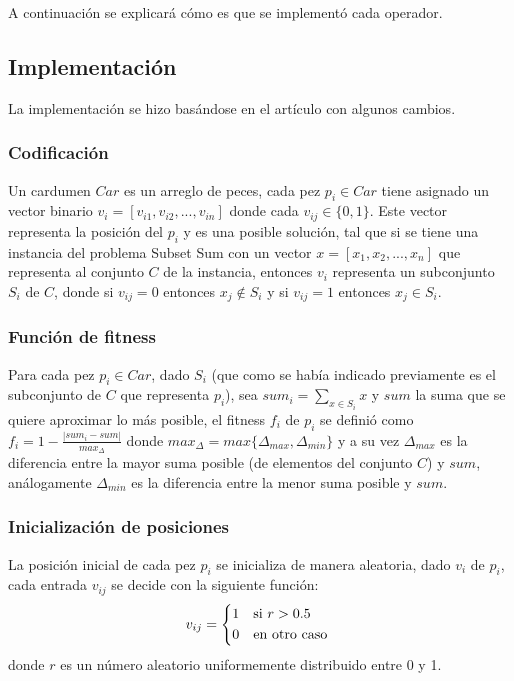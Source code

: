 \documentclass[12pt]{article}
\begin{document}
A continuación se explicará cómo es que se implementó cada operador.

\newpage

\subsection{Implementación}
La implementación se hizo basándose en el artículo \cite{articulo} con algunos cambios.

\subsubsection{Codificación}
Un cardumen $Car$ es un arreglo de peces, cada pez $p_i \in Car$ tiene asignado un vector binario $v_i = [v_{i1}, v_{i2},...,v_{in}]$ donde cada $v_{ij} \in \{0, 1\}$. Este vector representa la posición del $p_i$ y es una posible solución, tal que si se tiene una instancia del problema Subset Sum con un vector $x = [ x_1, x_2,...,x_n]$ que representa al conjunto $C$ de la instancia, entonces $v_i$ representa un subconjunto $S_i$ de $C$, donde si $v_{ij} = 0$ entonces $x_j \notin S_i$ y si $v_{ij} = 1$ entonces $x_j \in S_i$.

\subsubsection{Función de fitness}
Para cada pez $p_i \in Car$, dado $S_i$ (que como se había indicado previamente es el subconjunto de $C$ que representa $p_i$), sea $sum_i = \sum\limits_{x \in S_i}x$ y $sum$ la suma que se quiere aproximar lo más posible, el fitness $f_i$ de $p_i$ se definió como $f_i = 1 - \frac{|sum_i - sum|}{max_{\Delta}}$ donde $max_{\Delta} = max\{\Delta_{max}, \Delta_{min}\}$ y a su vez $\Delta_{max}$ es la diferencia entre la mayor suma posible (de elementos del conjunto $C$) y $sum$, análogamente $\Delta_{min}$ es la diferencia entre la menor suma posible y $sum$.

\subsubsection{Inicialización de posiciones}
La posición inicial de cada pez $p_i$ se inicializa de manera aleatoria, dado $v_i$ de $p_i$, cada entrada $v_{ij}$ se decide con la siguiente función:
\begin{equation*}
  v_{ij} =
  \begin{cases*}
      1 & si $r > 0.5$ \\
      0 & en otro caso 
    \end{cases*}
\end{equation*}
donde $r$ es un número aleatorio uniformemente distribuido entre 0 y 1.
\end{document}
